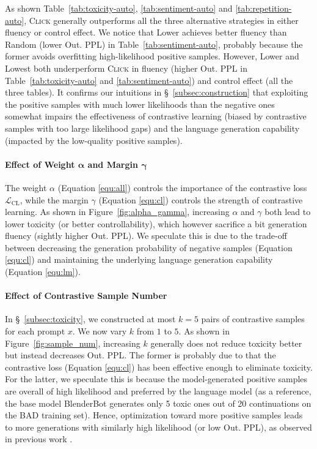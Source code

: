 As shown Table~\ref{tab:toxicity-auto}, \ref{tab:sentiment-auto} and \ref{tab:repetition-auto}, \textsc{Click} generally outperforms all the three alternative strategies in either fluency or control effect. We notice that Lower achieves better fluency than Random (lower Out. PPL) in Table~\ref{tab:sentiment-auto}, probably because the former avoids overfitting high-likelihood positive samples. However, Lower and Lowest both underperform \textsc{Click} in fluency (higher Out. PPL in Table~\ref{tab:toxicity-auto} and \ref{tab:sentiment-auto}) and control effect (all the three tables). It confirms our intuitions in \S~\ref{subsec:construction} that exploiting the positive samples with much lower likelihoods than the negative ones somewhat impairs the effectiveness of contrastive learning (biased by contrastive samples with too large likelihood gaps) and the language generation capability (impacted by the low-quality positive samples).

\paragraph{Effect of Weight $\bm{\alpha}$ and Margin $\bm{\gamma}$}
The weight $\alpha$ (Equation \ref{equ:all}) controls the importance of the contrastive loss $\mathcal{L}_\mathrm{CL}$, while the margin $\gamma$ (Equation \ref{equ:cl}) controls the strength of contrastive learning. As shown in Figure~\ref{fig:alpha_gamma}, increasing $\alpha$ and $\gamma$ both lead to lower toxicity (or better controllability), which however sacrifice a bit generation fluency (sightly higher Out. PPL). We speculate this is due to the trade-off between decreasing the generation probability of negative samples (Equation \ref{equ:cl}) and maintaining the underlying language generation capability (Equation \ref{equ:lm}).

\paragraph{Effect of Contrastive Sample Number} In \S~\ref{subsec:toxicity}, we constructed at most $k=5$ pairs of contrastive samples for each prompt $x$. We now vary $k$ from $1$ to $5$. As shown in Figure~\ref{fig:sample_num}, increasing $k$ generally does not reduce toxicity better but instead decreases Out. PPL. The former is probably due to that the contrastive loss (Equation \ref{equ:cl}) has been effective enough to eliminate toxicity. For the latter, we speculate this is because the model-generated positive samples are overall of high likelihood and preferred by the language model (as a reference, the base model BlenderBot generates only 5 toxic ones out of 20 continuations on the BAD training set). Hence, optimization toward more positive samples leads to more generations with similarly high likelihood (or low Out. PPL), as observed in previous work \cite{wang2022exploring}.

